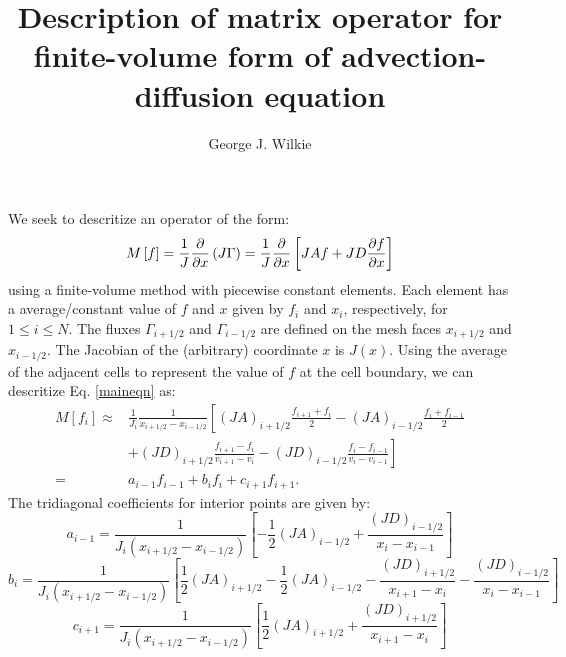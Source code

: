 \documentclass[12pt]{article}
\title{Description of matrix operator for finite-volume form of advection-diffusion equation}
\author{George J. Wilkie}
\begin{document}
\maketitle


We seek to descritize an operator of the form:
\begin{equation} \label{maineqn}
   M\left[f \right] = \frac{1}{J} \frac{\partial  }{\partial x} \left( J \Gamma \right) =  \frac{1}{J} \frac{\partial  }{\partial x} \left[ J A f + J D  \frac{\partial f}{\partial x} \right]
\end{equation}
using a finite-volume method with piecewise constant elements. Each element has a average/constant value of $f$ and $x$ given by $f_i$ and $x_i$, respectively, for $1 \leq i \leq N$. The fluxes $\Gamma_{i+1/2}$ and $\Gamma_{i-1/2}$ are defined on the mesh faces $x_{i+1/2}$ and $x_{i-1/2}$. The Jacobian of the (arbitrary) coordinate $x$ is $J(x)$. Using the average of the adjacent cells to represent the value of $f$ at the cell boundary, we can descritize Eq. \ref{maineqn} as:
\begin{align}
   M\left[ f_i \right] \approx& \frac{1}{J_i} \frac{1}{x_{i+1/2} - x_{i-1/2}} \left[ \left(JA\right)_{i+1/2} \frac{f_{i+1} + f_i }{2}  -  \left(JA\right)_{i-1/2} \frac{ f_{i} + f_{i-1} }{2}   \right. \nonumber\\
   & \left. + \left(JD \right)_{i+1/2}\frac{ f_{i+1} - f_i }{v_{i+1}-v_i} - \left(JD \right)_{i-1/2} \frac{ f_{i} - f_{i-1} }{v_{i}-v_{i-1}}  \right]  \\
   =&  a_{i-1} f_{i-1} +  b_i f_i + c_{i+1} f_{i+1}  .
\end{align}
The tridiagonal coefficients for interior points are given by:
\begin{equation}
   a_{i-1} = \frac{1}{J_i \left( x_{i+1/2} - x_{i-1/2} \right)} \left[- \frac{1}{2}\left(JA\right)_{i-1/2} + \frac{\left(JD\right)_{i-1/2} }{ x_{i}-x_{i-1}} \right]
\end{equation}
\begin{equation}
   b_{i} = \frac{1}{J_i \left( x_{i+1/2} - x_{i-1/2} \right)} \left[ \frac{1}{2}\left(JA\right)_{i+1/2} - \frac{1}{2}\left(JA\right)_{i-1/2} - \frac{\left(JD\right)_{i+1/2} }{ x_{i+1}-x_i} - \frac{\left(JD\right)_{i-1/2} }{ x_{i}-x_{i-1}} \right]
\end{equation}
\begin{equation}
   c_{i+1} = \frac{1}{J_i \left( x_{i+1/2} - x_{i-1/2} \right)} \left[ \frac{1}{2}\left(JA\right)_{i+1/2} + \frac{\left(JD\right)_{i+1/2} }{ x_{i+1}-x_i} \right]
\end{equation}
\end{document}
